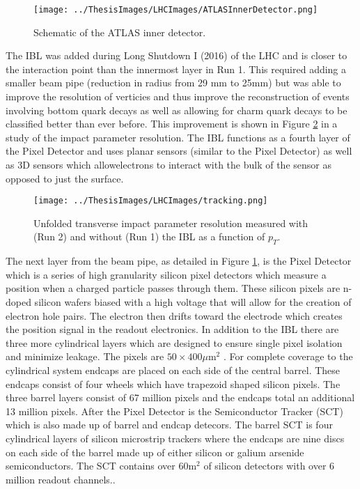 \begin{figure}[h!]
	\centering
	\texttt{[image: ../ThesisImages/LHCImages/ATLASInnerDetector.png]}
	\caption[Schematic of the ATLAS inner detector.]{Schematic of the ATLAS inner detector.\cite{ATLAS}
	}
	\label{fig:ATLASInnerDet}
\end{figure}

The IBL was added during Long Shutdown I (2016) of the LHC and is closer to the interaction point than the innermost layer in Run 1.  This required adding a smaller beam pipe (reduction in radius from 29 mm to 25mm) but was able to improve the resolution of verticies and thus improve the reconstruction of events involving bottom quark decays as well as allowing for charm quark decays to be classified better than ever before.  This improvement is shown in Figure \ref{fig:impParamIBL} in a study of the impact parameter resolution.  The IBL functions as a fourth layer of the Pixel Detector and uses planar sensors (similar to the Pixel Detector) as well as 3D sensors which allowelectrons to interact with the bulk of the sensor as opposed to just the surface. 

\begin{figure}[h!]
	\centering
	\texttt{[image: ../ThesisImages/LHCImages/tracking.png]}
	\caption[Unfolded transverse impact parameter resolution measured with (Run 2) and without (Run 1) the IBL as a function of $p_T$.]{Unfolded transverse impact parameter resolution measured with (Run 2) and without (Run 1) the IBL as a function of $p_T$.\cite{Takubo:2017wvt}
	}
	\label{fig:impParamIBL}
\end{figure}

The next layer from the beam pipe, as detailed in Figure \ref{fig:ATLASInnerDet}, is the Pixel Detector which is a series of high granularity silicon pixel detectors which measure a position when a charged particle passes through them.  These silicon pixels are n-doped silicon wafers biased with a high voltage that will allow for the creation of electron hole pairs.  The electron then drifts toward the electrode which creates the position signal in the readout electronics.  In addition to the IBL there are three more cylindrical layers which are designed to ensure single pixel isolation and minimize leakage.  The pixels are $50 \times 400\mu\text{m}^2$ .  For complete coverage to the cylindrical system endcaps are placed on each side of the central barrel.  These endcaps consist of four wheels which have trapezoid shaped silicon pixels.  The three barrel layers consist of 67 million pixels and the endcaps total an additional 13 million pixels.
After the Pixel Detector is the Semiconductor Tracker (SCT) which is also made up of barrel and endcap detecors.  The barrel SCT is four cylindrical layers of silicon microstrip trackers where the endcaps are nine discs on each side of the barrel made up of either silicon or galium arsenide semiconductors.  The SCT contains over $60\text{m}^2$ of silicon detectors with over 6 million readout channels..

